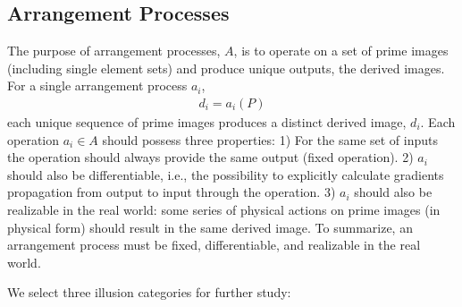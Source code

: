 \subsection{Arrangement Processes}
\label{diffill_sec:illusions}
The purpose of arrangement processes, $A$, is to operate on a set of prime images (including single element sets) and produce unique outputs, the derived images. For a single arrangement process $a_i$,
\begin{align}
    d_i = a_i(P)
\end{align}
each unique sequence of prime images produces a distinct derived image, $d_i$.
Each operation $a_i \in A$ should possess three properties:
1) For the same set of inputs the operation should always provide the same output (fixed operation).
2) $a_i$ should also be differentiable, i.e., the possibility to explicitly calculate gradients propagation from output to input through the operation.
3) $a_i$ should also be realizable in the real world: some series of physical actions on prime images (in physical form) should result in the same derived image.
To summarize, an arrangement process must be fixed, differentiable, and realizable in the real world.

We select three illusion categories for further study:

